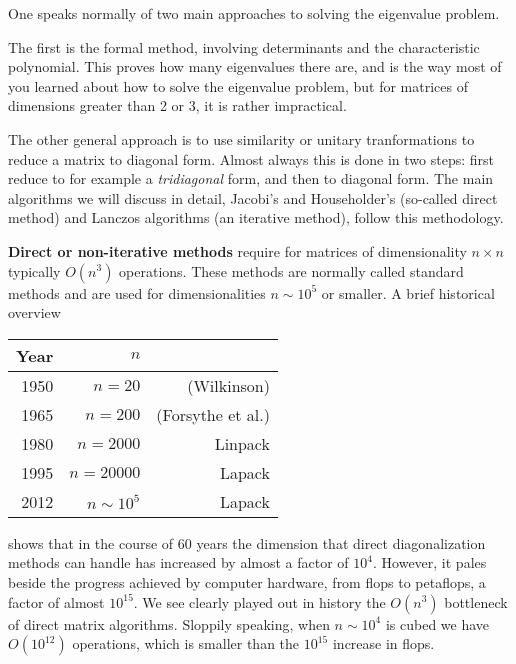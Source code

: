 One speaks normally of two main approaches to solving the eigenvalue problem.


The first is the formal method, involving determinants and the 
characteristic polynomial. This proves how many eigenvalues 
there are, and is the way most of you 
learned about how to solve the eigenvalue problem, but for 
matrices of dimensions greater than 2 or 3, it is rather
impractical.

The other general approach is to use similarity or unitary 
tranformations  to reduce a matrix to diagonal form. Almost always 
this is done in two steps: first reduce to for example a \textit{tridiagonal} 
form, and then to diagonal form. The main algorithms we will discuss 
in detail, Jacobi's and  Householder's  (so-called direct method) and Lanczos algorithms (an iterative method), follow this 
methodology. 


{\bf Direct or non-iterative methods}  require for matrices of dimensionality $n\times n$ typically $O(n^3)$ operations. These methods are normally called standard methods and are used for dimensionalities
$n \sim 10^5$ or smaller. A brief historical overview  
\begin{center}
\begin{tabular}{rrr}\hline
Year&$n$& \\\hline
  1950  & $n=20$    &(Wilkinson)      \\
  1965  &$n=200$    &(Forsythe et al.)      \\
  1980  &$n=2000$    &Linpack     \\
  1995  &$n=20000$    &Lapack      \\
  2012  &$n\sim 10^5$    &Lapack      \\ \hline
\end{tabular}  
\end{center}
shows that in the course of 60 years the dimension that  direct diagonalization methods can handle  has increased by almost a factor of
$10^4$. However, it pales beside the progress achieved by computer hardware, from flops to petaflops, a factor of almost $10^{15}$. We see clearly played out in history the $O(n^3)$ bottleneck  of direct matrix algorithms.\newline
Sloppily speaking, when  $n\sim 10^4$ is cubed we have $O(10^{12})$ operations, which is smaller than the $10^{15}$ increase in flops.  



